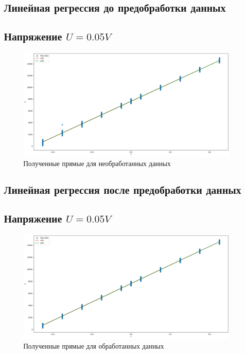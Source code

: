 \documentclass[12pt]{article}
\begin{document}
\subsection{Линейная регрессия до предобработки данных}
\subsection{Напряжение $U = 0.05V$}
\begin{figure}[htbp!]
    \begin{center}
        \includegraphics[width = 1\linewidth]{plots/unfiltered.png}
        \caption{Полученные прямые для необработанных данных}
    \end{center}
\end{figure}

\subsection{Линейная регрессия после предобработки данных}
\subsection{Напряжение $U = 0.05V$}
\begin{figure}[htbp!]
    \begin{center}
        \includegraphics[width = 1\linewidth]{plots/filtered.png}
        \caption{Полученные прямые для обработанных данных}
    \end{center}
\end{figure}
\end{document}
